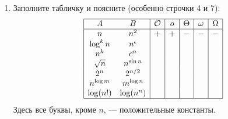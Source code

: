 \begin{enumerate}
\begin{enumerate}
\begin{proof}
        \begin{equation}
          f \preceq g \Leftrightarrow (f \prec g) \lor (f \sim g).
        \end{equation}
        \textit{В одну сторону}: если известно, что функция $f$ растет не быстрее, чем функция $g$, то это означает, что $f$ либо строго меньше $g$, либо равна $g$:
        \begin{equation}
          f \preceq g \Rightarrow (f \prec g) \lor (f \sim g).
        \end{equation}
        \textit{В обратную сторону}: если известно, что функция $f$ или строго меньше функции $g$, или равна $g$, то это означает, что не превосходит (меньше либо равна) $g$:
        \begin{equation}
          (f \prec g) \lor (f \sim g) \Rightarrow f \preceq g.
        \end{equation}
        Так как было проведено доказательство в обе стороны, то можно ввести эквивалентность устверждений:
        \begin{equation}
          f \preceq g \Leftrightarrow (f \prec g) \lor (f \sim g).
        \end{equation}
      \end{proof}
    \end{enumerate}

  \item Заполните табличку и поясните (особенно строчки 4 и 7):
    $$
    \begin{array}{|cc|c|c|c|c|c|}
      \hline
      A & B & \mathcal{O} & o & \Theta & \omega & \Omega \\
      \hline
      n & n^2 & + & + & - & - & - \\
      \log^k n & n^{\epsilon} & & & & & \\
      n^k & c^n & & & & & \\
      \sqrt{n} & n^{\sin n} & & & & & \\
      2^n & 2^{n \slash 2} & & & & & \\
      n^{\log m} & m^{\log n} & & & & & \\
      \log (n!) & \log(n^n) & & & & & \\
      \hline
    \end{array}
    $$
    Здесь все буквы, кроме $n$, --- положительные константы.


\end{enumerate}

\clearpage
